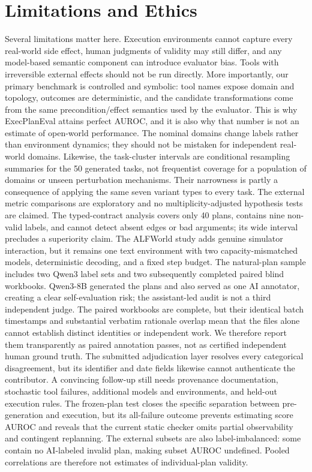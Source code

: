 \documentclass[10pt]{article}
\begin{document}
\section{Limitations and Ethics}
Several limitations matter here. Execution environments cannot capture every
real-world side effect, human judgments of validity may still differ, and any
model-based semantic component can introduce evaluator bias. Tools with
irreversible external effects should not be run directly. More importantly,
our primary benchmark is controlled and symbolic: tool names expose domain and
topology, outcomes are deterministic, and the candidate transformations come
from the same precondition/effect semantics used by the evaluator. This is why
ExecPlanEval attains perfect AUROC, and it is also why that number is not an
estimate of open-world performance. The nominal domains change labels rather
than environment dynamics; they should not be mistaken for independent
real-world domains. Likewise, the task-cluster intervals are conditional
resampling summaries for the 50 generated tasks, not frequentist coverage for a
population of domains or unseen perturbation mechanisms. Their narrowness is
partly a consequence of applying the same seven variant types to every task.
The external metric comparisons are exploratory and no multiplicity-adjusted
hypothesis tests are claimed. The typed-contract analysis covers only 40 plans,
contains nine non-valid labels, and cannot detect absent edges or bad arguments;
its wide interval precludes a superiority claim. The ALFWorld study adds genuine simulator interaction, but
it remains one text environment with two capacity-mismatched models,
deterministic decoding, and a
fixed step budget. The natural-plan sample includes two Qwen3 label sets and
two subsequently completed paired blind workbooks. Qwen3-8B generated the
plans and also served as one AI annotator, creating a clear self-evaluation
risk; the assistant-led audit is not a third independent judge. The paired
workbooks are complete, but their identical batch timestamps and substantial
verbatim rationale overlap mean that the files alone cannot establish distinct
identities or independent work. We therefore report them transparently as
paired annotation passes, not as certified independent human ground truth. The
submitted adjudication layer resolves every categorical disagreement, but its
identifier and date fields likewise cannot authenticate the contributor. A
convincing follow-up still needs provenance documentation, stochastic tool
failures, additional models and environments,
and held-out execution rules.
The frozen-plan test closes the specific separation between pre-generation
and execution, but its all-failure outcome prevents estimating score AUROC and
reveals that the current static checker omits partial observability and
contingent replanning.
The external subsets are also label-imbalanced: some contain no AI-labeled
invalid plan, making subset AUROC undefined. Pooled correlations are therefore
not estimates of individual-plan validity.
\end{document}
